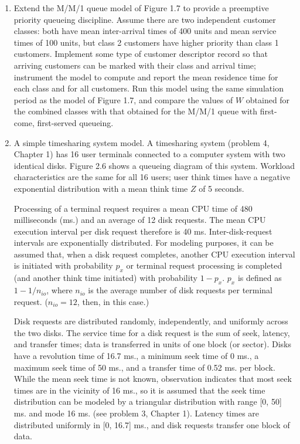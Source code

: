 \begin{enumerate}
\item Extend the M/M/1 queue model of Figure 1.7 to provide a preemptive
priority queueing discipline. Assume there are two independent customer
classes: both have mean inter-arrival times of 400 units and mean service times
of 100 units, but class 2 customers have higher priority than class 1
customers. Implement some type of customer descriptor record so that arriving
customers can be marked with their class and arrival time; instrument the
model to compute and report the mean residence time for each class and for all
customers. Run this model using the same simulation period as the model of
Figure 1.7, and compare the values of $W$ obtained for the combined classes
with that obtained for the M/M/1 queue with first-come, first-served queueing.

\item A simple timesharing system model. A timesharing system (problem 4,
Chapter 1) has 16 user terminals connected to a computer system with two
identical disks. Figure 2.6 shows a queueing diagram of this system. Workload
characteristics are the same for all 16 users; user think times have a
negative exponential distribution with a mean think time $Z$ of 5 seconds.

Processing of a terminal request requires a mean CPU time of 480 milliseconds
(ms.) and an average of 12 disk requests. The mean CPU execution interval per
disk request therefore is 40 ms. Inter-disk-request intervals are
exponentially distributed. For modeling purposes, it can be assumed that, when
a disk request completes, another CPU execution interval is initiated with
probability $p_x$ or terminal request processing is completed (and another
think time initiated) with probability $1 - p_x$. $p_x$ is defined as
$1 - 1/n_{io}$, where $n_{io}$ is the average number of disk requests per
terminal request. ($n_{io} = 12$, then, in this case.)

Disk requests are distributed randomly, independently, and uniformly across
the two disks. The service time for a disk request is the sum of seek, latency,
and transfer times; data is transferred in units of one block (or sector).
Disks have a revolution time of 16.7 ms., a minimum seek time of 0 ms., a
maximum seek time of 50 ms., and a transfer time of 0.52 ms. per block. While
 the mean seek time is not known, observation indicates that most seek times
are in the vicinity of 16 ms., so it is assumed that the seek time distribution
can be modeled by a triangular distribution with range [0, 50] ms. and mode
16 ms. (see problem 3, Chapter 1). Latency times are distributed uniformly in
[0, 16.7] ms., and disk requests transfer one block of data.


\end{enumerate}
